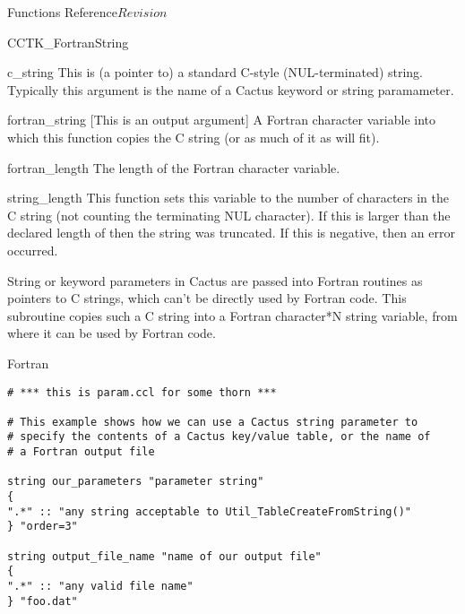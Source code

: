 \begin{cactuspart}{ Functions Reference}{}{$Revision$}
\begin{FunctionDescription}{CCTK\_FortranString}
\begin{ParameterSection}
\begin{Parameter}{c\_string}
This is (a pointer to) a standard C-style (NUL-terminated) string.
Typically this argument is the name of a Cactus keyword or string
paramameter.
\end{Parameter}
\begin{Parameter}{fortran\_string}
[This is an output argument]
A Fortran character variable into which this function copies
the C string (or as much of it as will fit).
\end{Parameter}
\begin{Parameter}{fortran\_length}
The length of the Fortran character variable.
\end{Parameter}
\end{ParameterSection}

\begin{ResultSection}
\begin{Result}{string\_length}
This function sets this variable to the number of characters in the
C string (not counting the terminating NUL character).  If this is
larger than the declared length of  then the
string was truncated.  If this is negative, then an error occurred.
\end{Result}
\end{ResultSection}

\begin{Discussion}
String or keyword parameters in Cactus are passed into Fortran routines
as pointers to C strings, which can't be directly used by Fortran code.
This subroutine copies such a C string into a Fortran character*N string
variable, from where it can be used by Fortran code.
\end{Discussion}

\begin{ExampleSection}
\begin{Example}{Fortran}
\begin{verbatim}
# *** this is param.ccl for some thorn ***

# This example shows how we can use a Cactus string parameter to
# specify the contents of a Cactus key/value table, or the name of
# a Fortran output file

string our_parameters "parameter string"
{
".*" :: "any string acceptable to Util_TableCreateFromString()"
} "order=3"

string output_file_name "name of our output file"
{
".*" :: "any valid file name"
} "foo.dat"



\end{verbatim}
\end{Example}
\end{ExampleSection}
\end{FunctionDescription}
\end{cactuspart}
